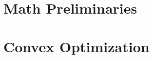 \documentclass[8pt, a4paper, landscape]{extarticle}
\author{Fabio Bühler, fabuehle@ethz.ch}
\begin{document}
    \setlength{\columnseprule}{0.5pt} %
    \begin{multicols*}{4} %
    \begin{adjustwidth}{1mm}{1mm} %


        \section{Math Preliminaries}
            
        \section{Convex Optimization}
            
            

    \end{adjustwidth}%
    \end{multicols*}
\end{document}
